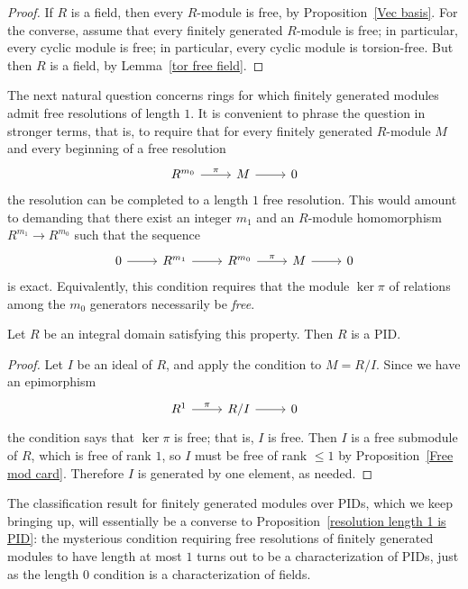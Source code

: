 \begin{proof}
If $R$ is a field, then every $R$-module is free, by Proposition~\ref{Vec basis}. For the converse, assume that every finitely generated $R$-module is free; in particular, every cyclic module is free; in particular, every cyclic module is torsion-free. But then $R$ is a field, by Lemma~\ref{tor free field}.
\end{proof}
The next natural question concerns rings for which finitely generated modules admit free resolutions of length $1$. It is convenient to phrase the question in stronger terms, that is, to require that for every finitely generated $R$-module $M$ and every beginning of a free resolution
\[\begin{tikzcd}
R^{m_0}\ar[r,"\pi"]&M\ar[r]&0
\end{tikzcd}\]
the resolution can be completed to a length $1$ free resolution. This would amount to demanding that there exist an integer $m_1$ and an $R$-module homomorphism $R^{m_1}\to R^{m_0}$ such that the sequence
\[\begin{tikzcd}
0\ar[r]&R^{m_1}\ar[r]&R^{m_0}\ar[r,"\pi"]&M\ar[r]&0
\end{tikzcd}\]
is exact. Equivalently, this condition requires that the module $\ker\pi$ of relations among the $m_0$ generators necessarily be \textit{free}.
\begin{proposition}\label{resolution length 1 is PID}
Let $R$ be an integral domain satisfying this property. Then $R$ is a PID.
\end{proposition}
\begin{proof}
Let $I$ be an ideal of $R$, and apply the condition to $M=R/I$. Since we have an epimorphism
\[\begin{tikzcd}
R^1\ar[r,"\pi"]&R/I\ar[r]&0
\end{tikzcd}\]
the condition says that $\ker\pi$ is free; that is, $I$ is free. Then $I$ is a free submodule of $R$, which is free of rank $1$, so $I$ must be free of rank $\leq1$ by Proposition~\ref{Free mod card}. Therefore $I$ is generated by one element, as needed.
\end{proof}
The classification result for finitely generated modules over PIDs, which we keep bringing up, will essentially be a converse to Proposition~\ref{resolution length 1 is PID}: the mysterious condition requiring free resolutions of finitely generated modules to have length at most $1$ turns out to be a characterization of PIDs, just as the length $0$ condition is a characterization of fields.
